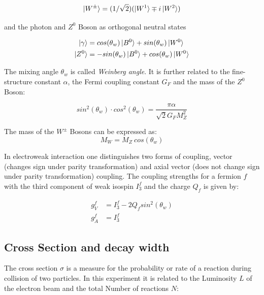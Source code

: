 \begin{equation}
\ket{W^{\pm}}=(1/\sqrt{2}) (\ket{W^1}\mp i\ket{W^2})
\end{equation}

and the photon and $Z^0$ Boson as orthogonal neutral states\cite{Grif}

\begin{equation}
\begin{aligned}
\ket{\gamma} &=  cos(\theta_w)\ket{B^0} + sin(\theta_w) \ket{W^0}\\
\ket{Z^0} &= -sin(\theta_w) \ket{B^0} + cos(\theta_w) \ket{W^0}
\end{aligned}
\end{equation}

The mixing angle $\theta_w$ is called \emph{Weinberg angle}. It is further related to the fine-structure constant  $\alpha$, the Fermi coupling constant $G_F$ and the mass of the $Z^0$ Boson\cite{muenchen}:

\begin{equation}
sin^2(\theta_w)\cdot cos^2(\theta_w) = \frac{\pi\alpha}{\sqrt{2}G_FM_Z^2}
\end{equation}

The mass of the $W^{\pm}$ Bosons can be expressed as:
\begin{equation}
M_W = M_Z~cos(\theta_w)
\end{equation}

In electroweak interaction one distinguishes two forms of coupling, vector (changes sign under parity transformation) and axial vector (does not change sign under parity transformation) coupling. The coupling strengths for a fermion $f$ with the third component of weak isospin $I^f_3$ and the charge $Q_f$ is given by\cite{muenchen}:

\begin{equation}
\begin{aligned}
g_V^f &= I^f_3-2 Q_f sin^2(\theta_w)\\
g_A^f &= I^f_3
\end{aligned}
\label{eq:principles:coupling strengths}
\end{equation}

\subsection{Cross Section and decay width}
The cross section $\sigma$ is a measure for the probability or rate of a reaction during collision of two particles. In this experiment it is related to the Luminosity $L$ of the electron beam and the total Number of reactions $N$:

